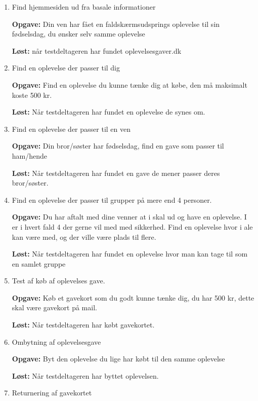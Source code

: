 \documentclass[12pt,a4paper,oneside]{article}
\begin{document}
\begin{enumerate}

\item{ Find hjemmesiden ud fra basale informationer}

\textbf{Opgave:} Din ven har fået en faldskærmsudsprings oplevelse til sin fødselsdag, du ønsker selv samme oplevelse

\textbf{Løst:} når testdeltageren har fundet oplevelsesgaver.dk

\item{Find en oplevelse der passer til dig}

\textbf{Opgave:} Find en oplevelse du kunne tænke dig at købe, den må maksimalt koste 500 kr.

\textbf{Løst:} Når testdeltageren har fundet en oplevelse de synes om.

\item{Find en oplevelse der passer til en ven}

\textbf{Opgave:} Din bror/søster har fødselsdag, find en gave som passer til ham/hende

\textbf{Løst:} Når testdeltageren har fundet en gave de mener passer deres bror/søster.

\item{
Find en oplevelse der passer til grupper på mere end 4 personer.}

\textbf{Opgave:} Du har aftalt med dine venner at i skal ud og have en oplevelse. I er i hvert fald 4 der gerne vil med med sikkerhed. Find en oplevelse hvor i ale kan være med, og der ville være plads til flere.

\textbf{Løst:} Når testdeltageren har fundet en oplevelse hvor man kan tage til som en samlet gruppe

\item{Test af køb af oplevelses gave.}

\textbf{Opgave:} Køb et gavekort som du godt kunne tænke dig, du har 500 kr, dette skal være gavekort på mail.

\textbf{Løst:} Når testdeltageren har købt gavekortet.

\item{Ombytning af oplevelsesgave}

\textbf{Opgave:} Byt den oplevelse du lige har købt til den samme oplevelse

\textbf{Løst:} Når testdeltageren har byttet oplevelsen.

\item{Returnering af gavekortet}


\end{enumerate}
\end{document}
